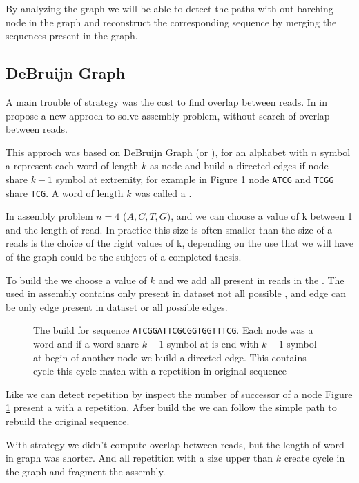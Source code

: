 \documentclass[./main.tex]{subfiles}
\begin{document}
By analyzing the graph we will be able to detect the paths with out barching node in the graph and reconstruct the corresponding sequence by merging the sequences present in the graph.

\subsection{DeBruijn Graph}

A main trouble of \OLC strategy was the cost to find overlap between reads. In \citeauthor{eulerian_approach} in \cite{eulerian_approach} propose a new approch to solve assembly problem, without search of overlap between reads.

This approch was based on DeBruijn Graph (or \DBG), for an alphabet with $n$ symbol a \DBG represent each word of length $k$ as node and build a directed edges if node share $k - 1$ symbol at extremity, for example in Figure \ref{intro:fig:dbg:graph} node \texttt{ATCG} and \texttt{TCGG} share \texttt{TCG}. A word of length $k$ was called a \kmer.

In assembly problem $n = 4$ (${A, C, T, G}$), and we can choose a value of k between 1 and the length of read. In practice this size is often smaller than the size of a reads is the choice of the right values of k, depending on the use that we will have of the \DBG graph could be the subject of a completed thesis.

To build the \DBG we choose a value of $k$ and we add all \kmer present in reads in the \DBG. The \DBG used in assembly contains only \kmer present in dataset not all possible \kmer, and edge can be only edge present in dataset or all possible edges.

\begin{figure}[ht]
    
    \caption{The \DBG build for sequence \texttt{ATCGGATTCGCGGTGGTTTCG}. Each node was a word and if a word share $k - 1$ symbol at is end with $k - 1$ symbol at begin of another node we build a directed edge. This \DBG contains cycle this cycle match with a repetition in original sequence}
    \label{intro:fig:dbg:graph}
\end{figure}

Like \OLC we can detect repetition by inspect the number of successor of a node Figure \ref{intro:fig:dbg:graph} present a \DBG with a repetition. After build the \DBG we can follow the simple path to rebuild the original sequence.

With \DBG strategy we didn't compute overlap between reads, but the length of word in graph was shorter. And all repetition with a size upper than $k$ create cycle in the graph and fragment the assembly.
\end{document}
